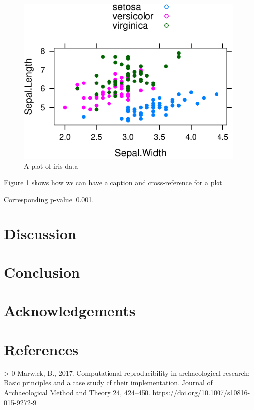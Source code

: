 \documentclass[]{elsarticle} %
\newlength{\cslhangindent}
\newenvironment{CSLReferences}[3] %
 {%
  \setlength{\parindent}{0pt}
  \ifodd #1 \everypar{\setlength{\hangindent}{\cslhangindent}}\ignorespaces\fi
  \ifnum #2 > 0
  \setlength{\parskip}{#3\baselineskip}
  \fi
 }%
 {}
\begin{document}
\begin{figure}
\centering
\includegraphics{../figures/demo-plot-1.pdf}
\caption{\label{fig:demo-plot}A plot of iris data}
\end{figure}

Figure \ref{fig:demo-plot} shows how we can have a caption and cross-reference for a plot

Corresponding p-value: 0.001.

\hypertarget{discussion}{%
\section{Discussion}\label{discussion}}

\hypertarget{conclusion}{%
\section{Conclusion}\label{conclusion}}

\hypertarget{acknowledgements}{%
\section{Acknowledgements}\label{acknowledgements}}

\newpage

\hypertarget{references}{%
\section{References}\label{references}}

\hypertarget{refs}{}
\begin{CSLReferences}{1}{0}
\leavevmode\hypertarget{ref-Marwick2017}{}%
Marwick, B., 2017. Computational reproducibility in archaeological research: Basic principles and a case study of their implementation. Journal of Archaeological Method and Theory 24, 424--450. \url{https://doi.org/10.1007/s10816-015-9272-9}

\end{CSLReferences}
\end{document}
